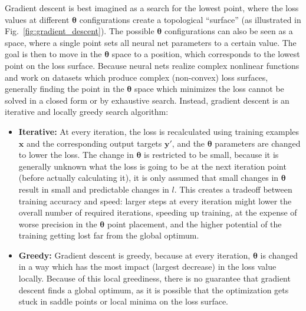 			Gradient descent is best imagined as a search for the lowest point, where the loss values at different $\mathbf{\theta}$ configurations create a topological ``surface'' (as illustrated in Fig.~\ref{fig:gradient_descent}).
			The possible $\mathbf{\theta}$ configurations can also be seen as a space, where a single point sets all neural net parameters to a certain value.
			The goal is then to move in the $\mathbf{\theta}$ space to a position, which corresponds to the lowest point on the loss surface.
			Because neural nets realize complex nonlinear functions and work on datasets which produce complex (non-convex) loss surfaces, generally finding the point in the $\mathbf{\theta}$ space which minimizes the loss cannot be solved in a closed form or by exhaustive search.
			Instead, gradient descent is an iterative and locally greedy search algorithm:
			\begin{itemize}
				\item \textbf{Iterative:} At every iteration, the loss is recalculated using training examples $\mathbf{x}$ and the corresponding output targets $\mathbf{y}'$, and the $\mathbf{\theta}$ parameters are changed to lower the loss.
				The change in $\mathbf{\theta}$ is restricted to be small, because it is generally unknown what the loss is going to be at the next iteration point (before actually calculating it), it is only assumed that small changes in $\mathbf{\theta}$ result in small and predictable changes in $l$.
				This creates a tradeoff between training accuracy and speed: larger steps at every iteration might lower the overall number of required iterations, speeding up training, at the expense of worse precision in the $\mathbf{\theta}$ point placement, and the higher potential of the training getting lost far from the global optimum.
				
				\item \textbf{Greedy:} Gradient descent is greedy, because at every iteration, $\mathbf{\theta}$ is changed in a way which has the most impact (largest decrease) in the loss value locally.
				Because of this local greediness, there is no guarantee that gradient descent finds a global optimum, as it is possible that the optimization gets stuck in saddle points or local minima on the loss surface.
			\end{itemize}
		
